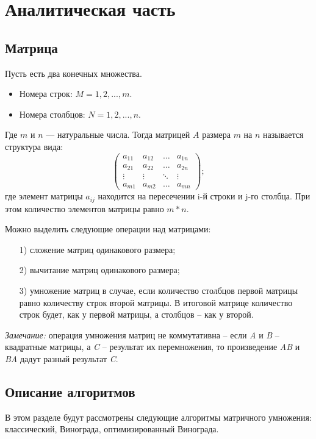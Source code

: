 \chapter{Аналитическая часть}
\section{Матрица}
Пусть есть два конечных множества.
\begin{itemize}
	\item  Номера строк: $M = {1, 2, ..., m}$.
	\item  Номера столбцов: $N = {1, 2, ..., n}$. 
\end{itemize}
Где $m$ и $n$ --- натуральные числа.
Тогда матрицей $A$  размера $m$ на $n$ называется структура вида:  
\begin{equation}
	\begin{pmatrix}
		a_{11} & a_{12} & \ldots & a_{1n}\\
		a_{21} & a_{22} & \ldots & a_{2n}\\
		\vdots & \vdots & \ddots & \vdots\\
		a_{m1} & a_{m2} & \ldots & a_{mn}
	\end{pmatrix};
\end{equation}
где элемент матрицы $a_{ij}$  находится на пересечении i-й строки и j-го столбца. При этом количество элементов матрицы равно $m * n$.

Можно выделить следующие операции над матрицами:
\begin{enumerate}
	\item[1)]  сложение матриц одинакового размера;
	\item[2)]  вычитание матриц одинакового размера;
	\item[3)]  умножение матриц в случае, если количество столбцов первой матрицы равно количеству строк второй матрицы. В итоговой матрице количество строк будет, как у первой матрицы, а столбцов -- как у второй. \newline
\end{enumerate}

\textit{Замечание:} операция умножения матриц не коммутативна -- если \textit{A} и \textit{B} -- квадратные матрицы, а \textit{C} -- результат их перемножения, то произведение \textit{AB} и \textit{BA} дадут разный результат \textit{C}.


\section{Описание алгоритмов}
В этом разделе будут рассмотрены следующие алгоритмы матричного умножения: классический, Винограда, оптимизированный Винограда.


